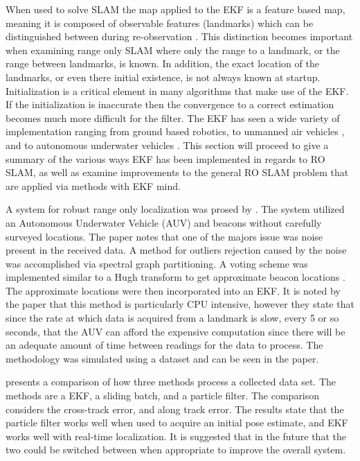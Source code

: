 \documentclass[conference]{IEEEtran}
\begin{document}
	 When used to solve SLAM the map applied to the EKF is a feature based map, meaning it is composed of observable features (landmarks) which can be distinguished between during re-observation \cite{Thrun2002}. This distinction becomes important when examining range only SLAM where only the range to a landmark, or the range between landmarks, is known. 
	 In addition, the exact location of the landmarks, or even there initial existence, is not always known at startup. Initialization is a critical element in many algorithms that make use of the EKF. If the initialization is inaccurate then the convergence to a correct estimation becomes much more difficult for the filter. The EKF has seen a wide variety of implementation ranging from ground based robotics\cite{Djugash2008}, to unmanned air vehicles \cite{Fabresse2016}, and to autonomous underwater vehicles \cite{Olson2006}. This section will proceed to give a summary of the various ways EKF has been implemented in regards to RO SLAM, as well as examine improvements to the general RO SLAM problem that are applied via methods with EKF mind.
	
	
	
	A system for robust range only localization was prosed by \cite{Olson2006}. The system utilized an Autonomous Underwater Vehicle (AUV) and beacons without carefully surveyed locations. The paper notes that one of the majors issue was noise present in the received data. A method for outliers rejection caused by the noise was accomplished via spectral graph partitioning. A voting scheme was implemented similar to a Hugh transform to get approximate beacon locations \cite{Hough1959}. The approximate locations were then incorporated into an EKF. It is noted by the paper that this method is particularly CPU intensive, however they state that since the rate at which data is acquired from a landmark is slow, every 5 or so seconds, that the AUV can afford the expensive computation since there will be an adequate amount of time between readings for the data to process. The methodology was simulated using a dataset and can be seen in the paper.
	
	
	
	\cite{Kurth2003} presents a comparison of how three methods process a collected data set. The methods are a EKF, a sliding batch, and a particle filter. The comparison considers the cross-track error, and along track error. The results state that the particle filter works well when used to acquire an initial pose estimate, and EKF works well with real-time localization. It is suggested that in the future that the two could be switched between when appropriate to improve the overall system. 
	
\end{document}
